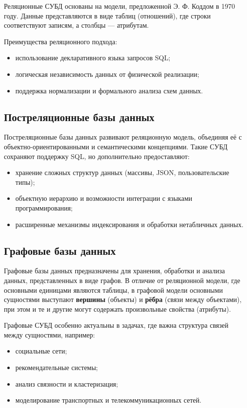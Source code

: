 Реляционные СУБД основаны на модели, предложенной Э. Ф. Коддом в 1970 году. Данные представляются в виде таблиц (отношений), где строки соответствуют записям, а столбцы — атрибутам.

Преимущества реляционного подхода:
\begin{itemize}
    \item использование декларативного языка запросов SQL;
    \item логическая независимость данных от физической реализации;
    \item поддержка нормализации и формального анализа схем данных.
\end{itemize}

\subsection{Постреляционные базы данных}

Постреляционные базы данных развивают реляционную модель, объединяя её с объектно-ориентированными и семантическими концепциями. Такие СУБД сохраняют поддержку SQL, но дополнительно предоставляют:

\begin{itemize}
    \item хранение сложных структур данных (массивы, JSON, пользовательские типы);
    \item объектную иерархию и возможности интеграции с языками программирования;
    \item расширенные механизмы индексирования и обработки нетабличных данных.
\end{itemize}

\subsection{Графовые базы данных}

Графовые базы данных предназначены для хранения, обработки и анализа данных, представленных в виде графов. В отличие от реляционной модели, где основными единицами являются таблицы, в графовой модели основными сущностями выступают \textbf{вершины} (объекты) и \textbf{рёбра} (связи между объектами), при этом и те и другие могут содержать произвольные свойства (атрибуты).

Графовые СУБД особенно актуальны в задачах, где важна структура связей между сущностями, например:
\begin{itemize}
    \item социальные сети;
    \item рекомендательные системы;
    \item анализ связности и кластеризация;
    \item моделирование транспортных и телекоммуникационных сетей.
\end{itemize}

